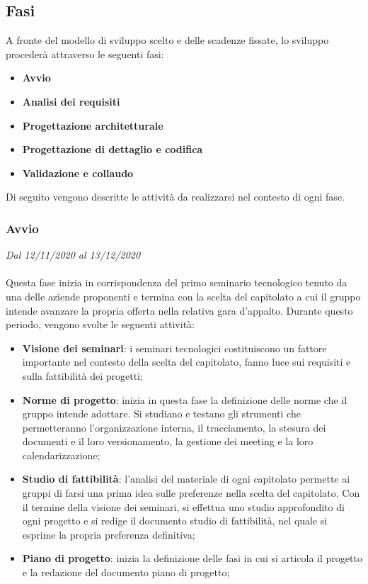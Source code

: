 \subsection{Fasi}

A fronte del modello di sviluppo scelto e delle scadenze fissate, lo sviluppo procederà attraverso le seguenti fasi:
\begin{itemize}
	\item \textbf{Avvio}
	\item \textbf{Analisi dei requisiti}
	\item \textbf{Progettazione architetturale}
	\item \textbf{Progettazione di dettaglio e codifica}
	\item \textbf{Validazione e collaudo}
\end{itemize}

Di seguito vengono descritte le attività da realizzarsi nel contesto di ogni fase.

\subsubsection{Avvio}

\textit{Dal 12/11/2020 al 13/12/2020}
\\\\
Questa fase inizia in corrispondenza del primo seminario tecnologico tenuto da una delle aziende proponenti e termina con la scelta del capitolato a cui il gruppo intende avanzare la propria offerta nella relativa gara d'appalto.
Durante questo periodo, vengono svolte le seguenti attività:
\begin{itemize}
	\item \textbf{Visione dei seminari}: i seminari tecnologici costituiscono un fattore importante nel contesto della scelta del capitolato, fanno luce sui requisiti e sulla fattibilità dei progetti;
	\item \textbf{Norme di progetto}: inizia in questa fase la definizione delle norme che il gruppo intende adottare. Si studiano e testano gli strumenti che permetteranno l'organizzazione interna, il tracciamento, la stesura dei documenti e il loro versionamento, la gestione dei meeting e la loro calendarizzazione;
	\item \textbf{Studio di fattibilità}: l'analisi del materiale di ogni capitolato permette ai gruppi di farsi una prima idea sulle preferenze nella scelta del capitolato. Con il termine della visione dei seminari, si effettua uno studio approfondito di ogni progetto e si redige il documento studio di fattibilità, nel quale si esprime la propria preferenza definitiva;
	\item \textbf{Piano di progetto}: inizia la definizione delle fasi in cui si articola il progetto e la redazione del documento piano di progetto;
\end{itemize}  





